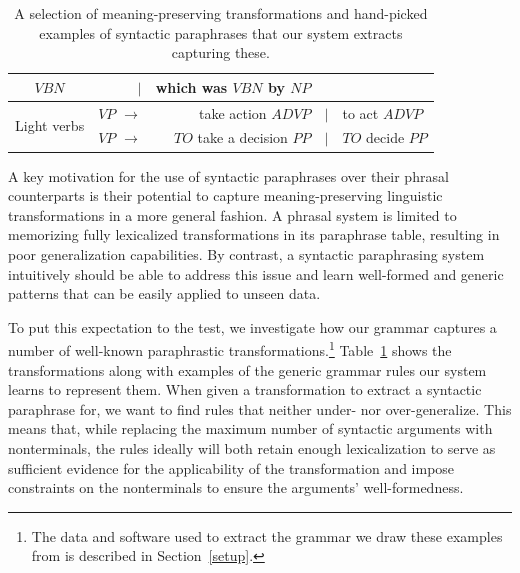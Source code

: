 \documentclass[11pt]{article}
\begin{document}
\begin{table}[!ht]
\begin{center}
\begin{tabular}{|c|rrcl|}
    $\mathit{VBN}$ & $\mid$ & which was $\mathit{VBN}$ by $\mathit{NP}$ \\
    \hline
    \multirow{2}{*}{Light verbs} & $\mathit{VP}$ $\rightarrow$ & take action $\mathit{ADVP}$ &
    $\mid$ & to act $\mathit{ADVP}$ \\
    & $\mathit{VP}$ $\rightarrow$ & $\mathit{TO}$ take a decision $\mathit{PP}$ &
    $\mid$ & $\mathit{TO}$ decide $\mathit{PP}$ \\
    \hline
\end{tabular}
\normalsize
\end{center}
\caption{A selection of meaning-preserving transformations and
  hand-picked examples of syntactic paraphrases that our system
  extracts capturing these.}
\label{example_rules}
\end{table}


A key motivation for the use of syntactic paraphrases over their
phrasal counterparts is their potential to capture meaning-preserving
linguistic transformations in a more general fashion. A phrasal system
is limited to memorizing fully lexicalized transformations in its
paraphrase table, resulting in poor generalization capabilities. By
contrast, a syntactic paraphrasing system intuitively should be able
to address this issue and learn well-formed and generic patterns that
can be easily applied to unseen data.

To put this expectation to the test, we investigate how our grammar
captures a number of well-known paraphrastic
transformations.\footnote{The data and software used to extract the
  grammar we draw these examples from is described in
  Section~\ref{setup}.} Table~\ref{example_rules} shows the
transformations along with examples of the generic grammar rules our
system learns to represent them. When given a transformation to
extract a syntactic paraphrase for, we want to find rules that neither
under- nor over-generalize. This means that, while replacing the
maximum number of syntactic arguments with nonterminals, the rules
ideally will both retain enough lexicalization to serve as sufficient
evidence for the applicability of the transformation and impose
constraints on the nonterminals to ensure the arguments'
well-formedness.
\end{document}
